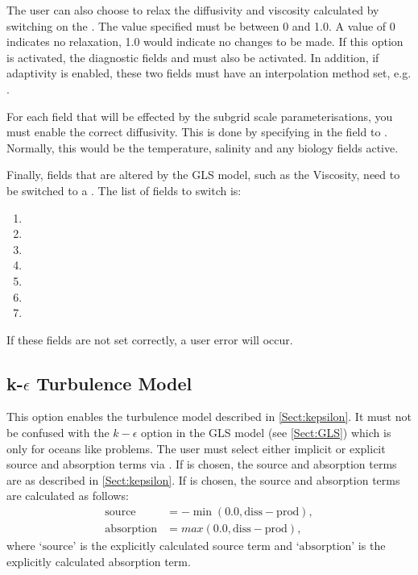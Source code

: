 The user can also choose to relax the diffusivity and viscosity calculated by switching on the\linebreak
{}. The value specified must be between 0 and 1.0. A value of 0 indicates
no relaxation, 1.0 would indicate no changes to be made. If this option is activated, the diagnostic fields
 and  must also
be activated. In addition, if adaptivity is enabled, these two fields must have an interpolation
method set, e.g. .

For each field that will be effected by the subgrid scale parameterisations, 
you must enable the correct diffusivity. This
is done by specifying  in the
field to . Normally, this would be the temperature, salinity and any biology fields active.

Finally, fields that are altered by the GLS model, such as the Viscosity, need to be switched
to a . The list of fields to switch is:
\begin{enumerate}
\item {}
\item {}
\item {}
\item {}
\item {}
\item {}
\item {}
\end{enumerate}

If these fields are not set correctly, a user error will occur.

\subsection{k-$\epsilon$ Turbulence Model}\label{Sect:kepsilon_usage}

This option enables the turbulence model described in \ref{Sect:kepsilon}. It must not be confused with the
$k-\epsilon$ option in the GLS model (see \ref{Sect:GLS}) which is only for oceans like problems.
The user must select either implicit or explicit source and absorption terms via .
If  is chosen, the source and absorption terms are as described in \ref{Sect:kepsilon}.
If  is chosen, the source and absorption terms are calculated as follows:
\begin{align*}
\textrm{source} &= -\min(0.0, \textrm{diss}-\textrm{prod}), \\
\textrm{absorption} &= max(0.0, \textrm{diss}-\textrm{prod}), 
\end{align*}
where `$\textrm{source}$' is the explicitly calculated source term and `$\textrm{absorption}$' is the explicitly calculated absorption term. 

